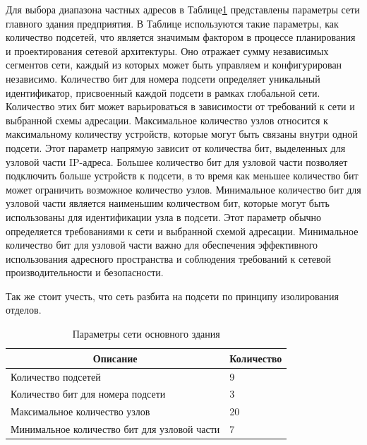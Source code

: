 Для выбора диапазона частных адресов в Таблице\;\ref{tab:net_parameters_gen} представлены параметры сети главного здания предприятия. В Таблице используются такие параметры, как количество подсетей, что является значимым фактором в процессе планирования и проектирования сетевой архитектуры. Оно отражает сумму независимых сегментов сети, каждый из которых может быть управляем и конфигурирован независимо. Количество бит для номера подсети определяет уникальный идентификатор, присвоенный каждой подсети в рамках глобальной сети. Количество этих бит может варьироваться в зависимости от требований к сети и выбранной схемы адресации. Максимальное количество узлов относится к максимальному количеству устройств, которые могут быть связаны внутри одной подсети. Этот параметр напрямую зависит от количества бит, выделенных для узловой части IP-адреса. Большее количество бит для узловой части позволяет подключить больше устройств к подсети, в то время как меньшее количество бит может ограничить возможное количество узлов. Минимальное количество бит для узловой части является наименьшим количеством бит, которые могут быть использованы для идентификации узла в подсети. Этот параметр обычно определяется требованиями к сети и выбранной схемой адресации. Минимальное количество бит для узловой части важно для обеспечения эффективного использования адресного пространства и соблюдения требований к сетевой производительности и безопасности.

Так же стоит учесть, что сеть разбита на подсети по принципу изолирования отделов.

\begin{table}[H]
\centering
{}
\caption{Параметры сети основного здания}\label{tab:net_parameters_gen}
\small
\begin{tabularx}{\textwidth}{|X|X|}
    \hline
    \multicolumn{1}{|c|}{Описание}                  & \multicolumn{1}{c|}{Количество} \\ \hline
    Количество подсетей                             & 9          \\ \hline
    Количество бит для номера подсети               & 3          \\ \hline
    Максимальное количество узлов                   & 20         \\ \hline
    Минимальное количество бит для узловой части    & 7          \\
    \hline
\end{tabularx}
\end{table}

